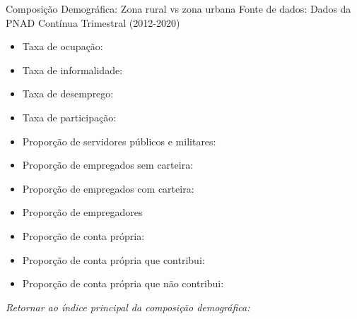 \begin{frame}[label=_composicao_demografica_rural_urbano]{Composição Demográfica: Zona rural vs zona urbana}
{\footnotesize Fonte de dados: Dados da PNAD Contínua Trimestral (2012-2020)}
\begin{itemize}
\item{Taxa de ocupação: \hyperlink{_composicao_demografica_rural_urbano_taxa_de_ocupacao}{}}
\item{Taxa de informalidade: \hyperlink{_composicao_demografica_rural_urbano_taxa_de_informalidade}{}}
\item{Taxa de desemprego: \hyperlink{_composicao_demografica_rural_urbano_taxa_de_desemprego}{}}
\item{Taxa de participação: \hyperlink{_composicao_demografica_rural_urbano_taxa_de_participacao}{}}
\item{Proporção de servidores públicos e militares: \hyperlink{_composicao_demografica_rural_urbano_prop_militar}{}}
\item{Proporção de empregados sem carteira: \hyperlink{_composicao_demografica_rural_urbano_prop_empregadoSC}{}}
\item{Proporção de empregados com carteira: \hyperlink{_composicao_demografica_rural_urbano_prop_empregadoCC}{}}
\item{Proporção de empregadores \hyperlink{_composicao_demografica_rural_urbano_prop_empregador}{}}
\item{Proporção de conta própria: \hyperlink{_composicao_demografica_rural_urbano_prop_cpropria}{}}
\item{Proporção de conta própria que contribui: \hyperlink{_composicao_demografica_rural_urbano_prop_cpropriaC}{}}
\item{Proporção de conta própria que não contribui: \hyperlink{_composicao_demografica_rural_urbano_prop_cpropriaNc}{}}
\end{itemize}

\begin{small}
\textit{Retornar ao índice principal da composição demográfica: \hyperlink{_composicao_demografica}{} }
\end{small}

\end{frame}

